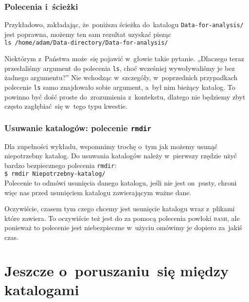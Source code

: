 \documentclass[10pt,t]{beamer}
\begin{document}
\begin{frame}
  \frametitle{Polecenia i~ścieżki}


  Przykładowo, zakładając, że~poniższa ścieżka do~katalogu
  \texttt{Data-for-analysis/} jest poprawna, możemy ten sam rezultat uzyskać
  pisząc \\
  \texttt{ls /home/adam/Data-directory/Data-for-analysis/}

  Niektórym z~Państwa może~się pojawić w~głowie takie pytanie. „Dlaczego
  teraz przesłaliśmy argument do polecenia \texttt{ls}, choć wcześniej
  wywoływaliśmy je bez żadnego argumentu?” Nie wchodząc w~szczegóły,
  w~poprzednich przypadkach polecenie \texttt{ls} samo znajdowało sobie
  argument, a~był nim bieżący katalog. To powinno być dość proste
  do~zrozumienia z~kontekstu, dlatego nie będziemy zbyt często
  zagłębiać~się w~tego typu kwestie.

\end{frame}





\begin{frame}
  \frametitle{Usuwanie katalogów: polecenie \texttt{rmdir}}


  Dla zupełności wykładu, wspomnimy trochę o~tym jak możemy usunąć
  niepotrzebny katalog. Do usuwania katalogów należy w~pierwszy rzędzie
  użyć bardzo bezpiecznego polecenia \texttt{rmdir}: \\
  \texttt{\$ rmdir Niepotrzebny-katalog/} \\
  Polecenie to odmówi usunięcia danego katalogu, jeśli nie jest on~pusty,
  chroni więc nas przed usunięciem katalogu zawierającym ważne dane.

  Oczywiście, czasem tym czego chcemy jest usunięcie katalogu wraz
  z~plikami które \alert{zawiera}. To oczywiście też jest do za pomocą
  polecenia powłoki \textsc{bash}, ale ponieważ to polecenie jest
  niebezpieczne w~użyciu omówimy je dopiero za~jakiś czas.

\end{frame}










\section{Jeszcze o~poruszaniu~się między katalogami}
\end{document}
